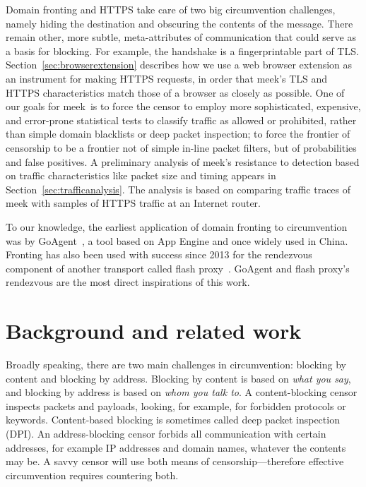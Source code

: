 \documentclass[conference]{IEEEtran}
\def\meek{meek}
\begin{document}
Domain fronting and HTTPS take care of two big circumvention challenges,
namely hiding the destination and obscuring the contents of the message.
There remain other, more subtle, meta-attributes of communication
that could serve as a basis for blocking.
For example, the handshake is a fingerprintable part of TLS.
Section~\ref{sec:browserextension} describes how we use a web browser extension as an instrument for making HTTPS requests,
in order that \meek's TLS and HTTPS characteristics
match those of a browser as closely as possible.
One of our goals for \meek\ is to force the censor
to employ more sophisticated, expensive, and error-prone statistical tests
to classify traffic as allowed or prohibited,
rather than simple domain blacklists or deep packet inspection;
to force the frontier of censorship
to be a frontier not of simple in-line packet filters,
but of probabilities and false positives.
A preliminary analysis of \meek's resistance to detection
based on traffic characteristics like packet size and timing
appears in Section~\ref{sec:trafficanalysis}.
The analysis is based on comparing traffic traces of \meek
with samples of HTTPS traffic at an Internet router.

To our knowledge,
the earliest application of domain fronting to circumvention
was by GoAgent~\cite{goagent},
a tool based on App Engine and
once widely used in China.
Fronting has also been used with success since 2013
for the rendezvous component of another transport called flash proxy~\cite{flashproxy}.
GoAgent and flash proxy's rendezvous are the most direct
inspirations of this work.


\section{Background and related work}
\label{sec:related-work}

Broadly speaking, there are two main challenges in circumvention:
blocking by content and blocking by address.
Blocking by content is based on \emph{what you say},
and blocking by address is based on \emph{whom you talk to}.
A content-blocking censor inspects packets and payloads,
looking, for example, for forbidden protocols or keywords.
Content-based blocking is sometimes called deep packet inspection (DPI).
An address-blocking censor forbids all communication with certain
addresses, for example IP addresses and domain names, whatever the contents may be.
A savvy censor will use both means of censorship---therefore
effective circumvention requires countering both.
\end{document}
